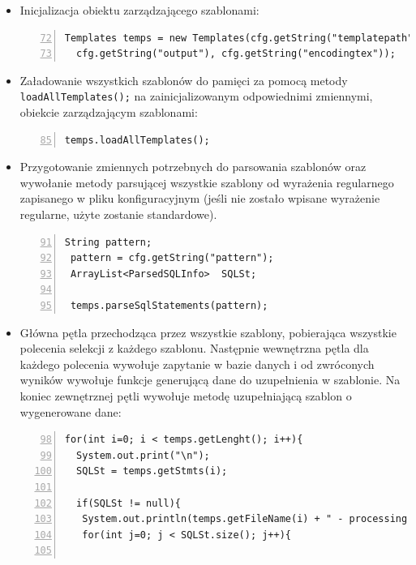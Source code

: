 \begin{itemize}
\vspace{5mm}
\item Inicjalizacja obiektu zarządzającego szablonami:

 \begin{lstlisting}[numbers=left,firstnumber=72]
 Templates temps = new Templates(cfg.getString("templatepath"),
  cfg.getString("output"), cfg.getString("encodingtex"));
\end{lstlisting}

\vspace{5mm}
\item Załadowanie wszystkich szablonów do pamięci za pomocą metody \texttt{loadAllTemplates();} na zainicjalizowanym odpowiednimi zmiennymi, obiekcie zarządzającym szablonami:

 \begin{lstlisting}[numbers=left,firstnumber=85]
 temps.loadAllTemplates();
\end{lstlisting}

\vspace{5mm}
\item Przygotowanie zmiennych potrzebnych do parsowania szablonów oraz wywołanie metody parsującej wszystkie szablony od wyrażenia regularnego zapisanego w pliku konfiguracyjnym (jeśli nie zostało wpisane wyrażenie regularne, użyte zostanie standardowe).

 \begin{lstlisting}[numbers=left,firstnumber=91]
 String pattern;
 pattern = cfg.getString("pattern");
 ArrayList<ParsedSQLInfo>  SQLSt;

 temps.parseSqlStatements(pattern);
\end{lstlisting}

\item Główna pętla przechodząca przez wszystkie szablony, pobierająca wszystkie polecenia selekcji z każdego szablonu. Następnie wewnętrzna pętla dla każdego polecenia wywołuje zapytanie w bazie danych i od zwróconych wyników wywołuje funkcje generującą dane do uzupełnienia w szablonie. Na koniec zewnętrznej pętli wywołuje metodę uzupełniającą szablon o wygenerowane dane:

 \begin{lstlisting}[numbers=left,firstnumber=98]
 for(int i=0; i < temps.getLenght(); i++){
  System.out.print("\n");
  SQLSt = temps.getStmts(i);
      
  if(SQLSt != null){
   System.out.println(temps.getFileName(i) + " - processing SQL statements");
   for(int j=0; j < SQLSt.size(); j++){


\end{lstlisting}
\end{itemize}
